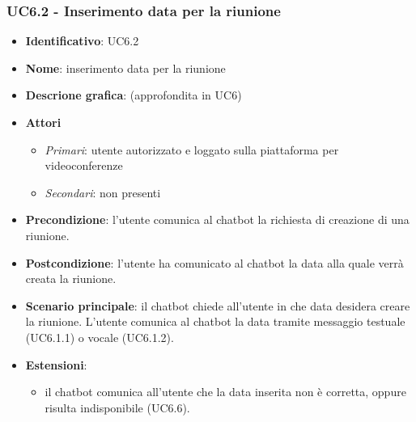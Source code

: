 \subsubsection{UC6.2 - Inserimento data per la riunione}
\begin{itemize}
    \item \textbf{Identificativo}: UC6.2
    \item \textbf{Nome}: inserimento data per la riunione
    \item \textbf{Descrione grafica}: (approfondita in UC6)
    \item \textbf{Attori}
 \begin{itemize} 
    \item \textit{Primari}: utente autorizzato e loggato sulla piattaforma per videoconferenze
    \item \textit{Secondari}: non presenti
 \end{itemize}
 \item \textbf{Precondizione}: l'utente comunica al chatbot la richiesta di creazione di una riunione.
 \item \textbf{Postcondizione}: l'utente ha comunicato al chatbot la data alla quale verrà creata la riunione.
 \item \textbf{Scenario principale}: il chatbot chiede all'utente in che data desidera creare la riunione. L'utente comunica al chatbot la data tramite messaggio testuale (UC6.1.1) o vocale (UC6.1.2).
 \item \textbf{Estensioni}: 
 \begin{itemize} 
    \item il chatbot comunica all'utente che la data inserita non è corretta, oppure risulta indisponibile (UC6.6).
 \end{itemize}
\end{itemize}
